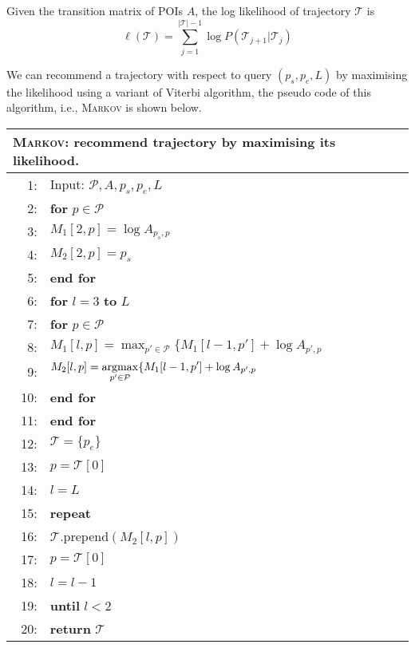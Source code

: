 Given the transition matrix of POIs $A$, the log likelihood of trajectory $\mathcal{T}$ is
\begin{displaymath}
    \ell(\mathcal{T}) = \sum_{j=1}^{|\mathcal{T}|-1} \log P(\mathcal{T}_{j+1} | \mathcal{T}_j)
\end{displaymath}

We can recommend a trajectory with respect to query $(p_s, p_e, L)$ by maximising the likelihood 
using a variant of Viterbi algorithm, the pseudo code of this algorithm, 
i.e., \textsc{Markov} is shown below.

\begin{table}
\centering
\small
\begin{tabular}{rl}
\hline
\multicolumn{2}{l}{\textsc{Markov}: recommend trajectory by maximising its likelihood.} \\
\hline
 1:& Input: $\mathcal{P}, A, p_s, p_e, L$ \\
 2:&\textbf{for} $p \in \mathcal{P}$ \\
 3:&\hspace{10pt} $M_1[2, p] = \log A_{p_s, p}$ \\
 4:&\hspace{10pt} $M_2[2, p] = p_s$ \\
 5:&\textbf{end for} \\
 6:&\textbf{for} $l=3$ \textbf{to} $L$ \\
 7:&\hspace{10pt}\textbf{for} $p \in \mathcal{P}$ \\
 8:&\hspace{20pt}   \(\displaystyle M_1[l, p] = \max_{p' \in \mathcal{P}} \{ M_1[l-1, p'] + \log A_{p', p} \) \\
 9:&\hspace{20pt}   \(\displaystyle M_2[l, p] = \operatorname*{argmax}_{p' \in \mathcal{P}} \{ M_1[l-1, p'] + \log A_{p', p} \) \\
10:&\hspace{10pt}\textbf{end for} \\
11:&\textbf{end for} \\
12:&$\mathcal{T} = \{p_e\}$ \\
13:&$p = \mathcal{T}[0]$ \\
14:&$l = L$ \\
15:&\textbf{repeat} \\
16:&\hspace{10pt}$\mathcal{T}$.prepend$(M_2[l, p])$ \\
17:&\hspace{10pt}$p = \mathcal{T}[0]$ \\
18:&\hspace{10pt}$l = l - 1$ \\
19:&\textbf{until} $l < 2$ \\
20:&\textbf{return} $\mathcal{T}$ \\
\hline
\end{tabular}
\end{table}


